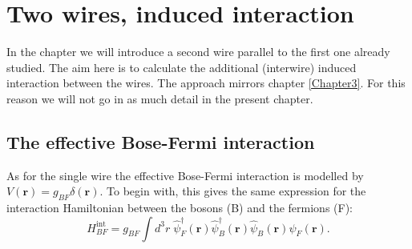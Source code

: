 
\chapter{Two wires, induced interaction} %

\label{Chapter8} %


In the chapter we will introduce a second wire parallel to the first one already studied. The aim here is to calculate the additional (interwire) induced interaction between the wires. The approach mirrors chapter \ref{Chapter3}. For this reason we will not go in as much detail in the present chapter.
\section{The effective Bose-Fermi interaction} 
As for the single wire the effective Bose-Fermi interaction is modelled by $V(\mathbf{r}) = g_{BF}\delta(\mathbf{r})$. To begin with, this gives the same expression for the interaction Hamiltonian between the bosons (B) and the fermions (F):
\begin{equation}
H_{BF}^\text{int} = g_{BF}\int d^3 r \; \hat{\psi}_F^\dagger(\mathbf{r}) \hat{\psi}_B^\dagger(\mathbf{r})\hat{\psi}_B(\mathbf{r})\hat{\psi}_F(\mathbf{r}).
\end{equation}

